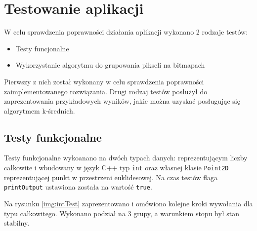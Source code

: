 \section{Testowanie aplikacji}

W celu sprawdzenia poprawności działania aplikacji wykonano 2 rodzaje testów:

\begin{itemize}
	\item Testy funcjonalne
	\item Wykorzystanie algorytmu do grupowania pikseli na bitmapach
\end{itemize}

Pierwszy z nich został wykonany w celu sprawdzenia poprawności zaimplementowanego rozwiązania. Drugi rodzaj testów posłużył do zaprezentowania przykładowych wyników, jakie można uzyskać posługując się algorytmem k-średnich.

\subsection{Testy funkcjonalne}

Testy funkcjonalne wykoanano na dwóch typach danych: reprezentującym liczby całkowite i wbudowany w język C++ typ \texttt{int} oraz własnej klasie \texttt{Point\textunderscore 2D} reprezentującej punkt w przestrzeni euklidesowej. Na czas testów flaga \texttt{printOutput} ustawiona została na wartość \texttt{true}.

Na rysunku \ref{img:intTest} zaprezentowano i omówiono kolejne kroki wywołania dla typu całkowitego. Wykonano podział na 3 grupy, a warunkiem stopu był stan stabilny.

